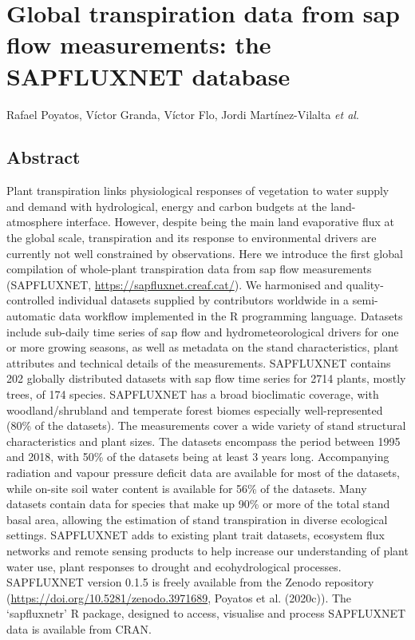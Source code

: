 \documentclass[11pt,twoside]{reedthesis}
\begin{document}
\chapter[The SAPFLUXNET database]{Global transpiration data from sap flow measurements: the SAPFLUXNET database}

\setlength{\parskip}{0.2cm plus4mm minus3mm} \setlength{\parindent}{0pt}
Rafael Poyatos, Víctor Granda, Víctor Flo, Jordi Martínez-Vilalta
\emph{et al}. \newpage
\setlength{\parindent}{30pt}

\section*{Abstract}

Plant transpiration links physiological responses of vegetation to water
supply and demand with hydrological, energy and carbon budgets at the
land-atmosphere interface. However, despite being the main land
evaporative flux at the global scale, transpiration and its response to
environmental drivers are currently not well constrained by
observations. Here we introduce the first global compilation of
whole-plant transpiration data from sap flow measurements (SAPFLUXNET,
\url{https://sapfluxnet.creaf.cat/}). We harmonised and
quality-controlled individual datasets supplied by contributors
worldwide in a semi-automatic data workflow implemented in the R
programming language. Datasets include sub-daily time series of sap flow
and hydrometeorological drivers for one or more growing seasons, as well
as metadata on the stand characteristics, plant attributes and technical
details of the measurements. SAPFLUXNET contains 202 globally
distributed datasets with sap flow time series for 2714 plants, mostly
trees, of 174 species. SAPFLUXNET has a broad bioclimatic coverage, with
woodland/shrubland and temperate forest biomes especially
well-represented (80\% of the datasets). The measurements cover a wide
variety of stand structural characteristics and plant sizes. The
datasets encompass the period between 1995 and 2018, with 50\% of the
datasets being at least 3 years long. Accompanying radiation and vapour
pressure deficit data are available for most of the datasets, while
on-site soil water content is available for 56\% of the datasets. Many
datasets contain data for species that make up 90\% or more of the total
stand basal area, allowing the estimation of stand transpiration in
diverse ecological settings. SAPFLUXNET adds to existing plant trait
datasets, ecosystem flux networks and remote sensing products to help
increase our understanding of plant water use, plant responses to
drought and ecohydrological processes. SAPFLUXNET version 0.1.5 is
freely available from the Zenodo repository
(\url{https://doi.org/10.5281/zenodo.3971689}, Poyatos et al. (2020c)).
The `sapfluxnetr' R package, designed to access, visualise and process
SAPFLUXNET data is available from CRAN.\par
\end{document}
